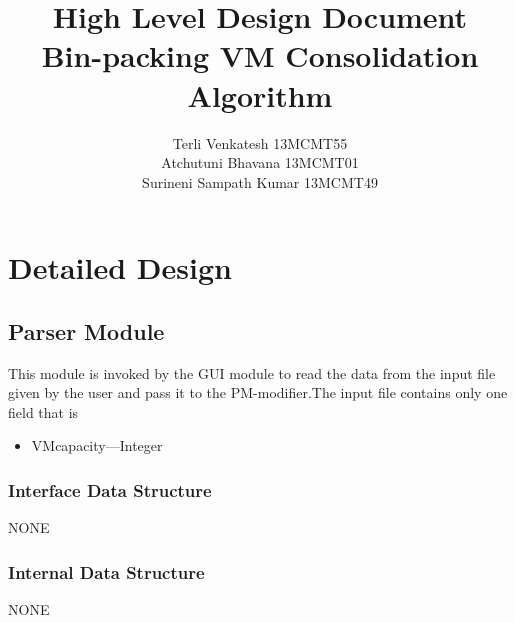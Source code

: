 ﻿\documentclass[a4paper,11pt]{article}
\title{High Level Design Document \\ Bin-packing VM Consolidation Algorithm}
\author{Terli Venkatesh 13MCMT55 \\ Atchutuni Bhavana 13MCMT01 \\ Surineni Sampath Kumar 13MCMT49}
\date{}
\begin{document}
\maketitle
\tableofcontents
\pagebreak

\section{Detailed Design}

\subsection{Parser Module}
This module is invoked by the GUI module to read the data from the input file given by the user and pass it to the PM-modifier.The input file contains only one field that is\\
\begin{itemize}
\item VMcapacity---Integer
\end{itemize}

\subsubsection{Interface Data Structure}
\hspace*{1.1cm}NONE
\subsubsection{Internal Data Structure}
\hspace*{1.1cm}NONE
\end{document}
